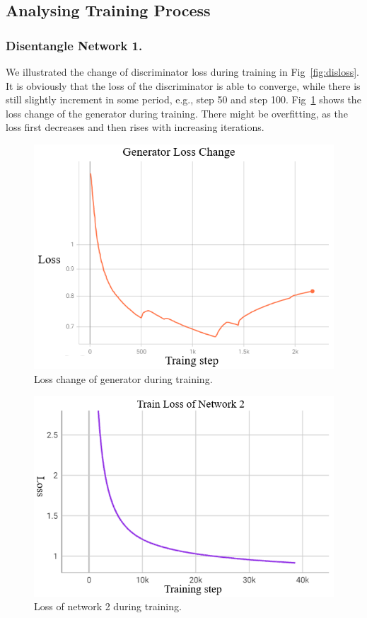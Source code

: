 \subsection{Analysing Training Process} 
\subsubsection{Disentangle Network 1.}
We illustrated the change of discriminator loss during training in Fig~\ref{fig:disloss}. 
It is obviously that the loss of the discriminator is able to converge, 
while there is still slightly increment in some period, e.g., step 50 and step 100.
Fig~\ref{fig:genloss} shows the loss change of the generator during training. 
There might be overfitting, 
as the loss first decreases and then rises with increasing iterations.


\begin{figure}[htb]
	\centering
	\includegraphics[width=1\linewidth]{imgs/gen_loss.png}
	\caption{Loss change of generator during training.}
	\label{fig:genloss}
\end{figure}

\begin{figure}[htb]
	\centering
	\includegraphics[width=0.9\linewidth]{imgs/st2_loss.png}
	\caption{Loss of network 2 during training.}
	\label{fig:st2loss}
\end{figure}

